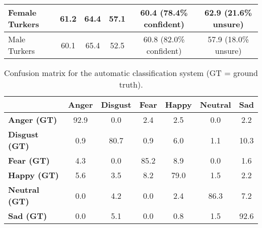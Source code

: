 \documentclass{article}
\begin{document}
\begin{table}[t!]
{\begin{tabular}{|l|c|c|c|c|c|c|c|}
		Female Turkers  & 61.2          & 64.4                                       & 57.1                                    & \multicolumn{2}{c|}{60.4 (78.4\% confident)}                                                                                        & \multicolumn{2}{c|}{62.9 (21.6\% unsure)}                                                                                     \\ \hline
		Male Turkers    & 60.1          & 65.4                                       & 52.5                                    & \multicolumn{2}{c|}{60.8 (82.0\% confident)}                                                                                        & \multicolumn{2}{c|}{57.9 (18.0\% unsure)}                                                                                     \\ \hline
	\end{tabular}
	}
\end{table}
\begin{table}[t!]
	\centering
	\caption{Confusion matrix for the automatic classification system (GT = ground truth).}
	\label{table:ConfusionOurSystemGA}
	\resizebox{\columnwidth}{!} {
		\begin{tabular}{|l|c|c|c|c|c|c|}
			\hline
			{\bf }             & {\bf Anger} & {\bf Disgust} & {\bf Fear} & {\bf Happy} & {\bf Neutral} & {\bf Sad} \\ \hline
			{\bf Anger (GT)}   & 92.9          & 0.0             & 2.4          & 2.5           & 0.0             & 2.2        \\ \hline
			{\bf Disgust (GT)} & 0.9           & 80.7            & 0.9          & 6.0           & 1.1             & 10.3     \\ \hline
			{\bf Fear (GT)}    & 4.3           & 0.0             & 85.2         & 8.9           & 0.0             & 1.6       \\ \hline
			{\bf Happy (GT)}   & 5.6           & 3.5             & 8.2          & 79.0          & 1.5             & 2.2       \\ \hline
			{\bf Neutral (GT)} & 0.0           & 4.2             & 0.0          & 2.4           & 86.3            & 7.2      \\ \hline
			{\bf Sad (GT)}     & 0.0           & 5.1             & 0.0          & 0.8           & 1.5             & 92.6      \\ \hline
		\end{tabular}
	}
\end{table}
		
\end{document}
